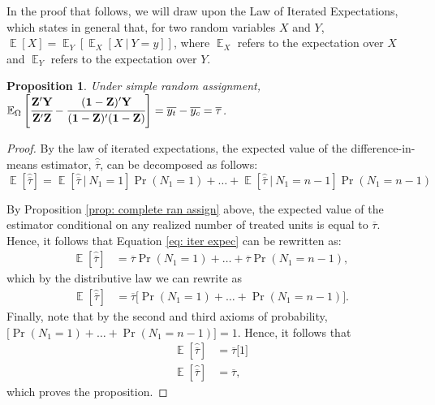 \documentclass[12pt,leqno]{article}
\newcommand\given[1][]{\:#1\vert\:}
\theoremstyle{newstyle}
\newtheorem{prop}[thm]{Proposition}
\DeclareMathOperator{\E}{\mathbb{E}}
\begin{document}
In the proof that follows, we will draw upon the Law of Iterated Expectations, which states in general that, for two random variables $X$ and $Y$, $\E\left[X\right] = \E_Y\left[\E_X\left[X \given Y = y\right]\right]$, where $\E_X$ refers to the expectation over $X$ and $\E_Y$ refers to the expectation over $Y$. 

\begin{prop}
\label{prop: simple random assign}
Under simple random assignment, $\mathbb{E}_{\Omega} \left[\cfrac{\mathbf{Z}^{\prime}\mathbf{Y}}{\mathbf{Z}^{\prime}\mathbf{Z}} - \cfrac{(\mathbf{1} - \mathbf{Z})^{\prime} \mathbf{Y}}{(\mathbf{1} - \mathbf{Z})^{\prime}(\mathbf{1} - \mathbf{Z})}\right] = \overline{y_{t}} - \overline{y_{c}} = \overline{\tau}$.
\end{prop}

\begin{proof}
By the law of iterated expectations, the expected value of the difference-in-means estimator, $\widehat{\overline{\tau}}$, can be decomposed as follows:
\begin{equation}
\label{eq: iter expec}
\E\left[\widehat{\overline{\tau}}\right] = \E\left[\widehat{\overline{\tau}} \given N_1 = 1\right] \Pr\left(N_1 = 1\right) + \dots + \E\left[\widehat{\overline{\tau}} \given N_1 = n - 1\right]\Pr\left(N_1 = n - 1\right) 
\end{equation}

By Proposition \ref{prop: complete ran assign} above, the expected value of the estimator conditional on any realized number of treated units is equal to $\overline{\tau}$. Hence, it follows that Equation \eqref{eq: iter expec} can be rewritten as:
\begin{align*}
\E\left[\widehat{\overline{\tau}}\right] & = \overline{\tau}\Pr\left(N_1 = 1\right) + \dots + \overline{\tau}\Pr\left(N_1 = n - 1\right),
\end{align*}
which by the distributive law we can rewrite as
\begin{align*}
\E\left[\widehat{\overline{\tau}}\right] & = \overline{\tau}\big[\Pr\left(N_1 = 1\right) + \dots + \Pr\left(N_1 = n - 1\right)\big].
\end{align*}
Finally, note that by the second and third axioms of probability, $\big[\Pr\left(N_1 = 1\right) + \dots + \Pr\left(N_1 = n - 1\right)\big] = 1$. Hence, it follows that
\begin{align*}
\E\left[\widehat{\overline{\tau}}\right] & = \overline{\tau}\big[1\big] \\ 
\E\left[\widehat{\overline{\tau}}\right] & = \overline{\tau},
\end{align*}
which proves the proposition.
\end{proof}

\begin{singlespace}

\end{singlespace}
\end{document}
